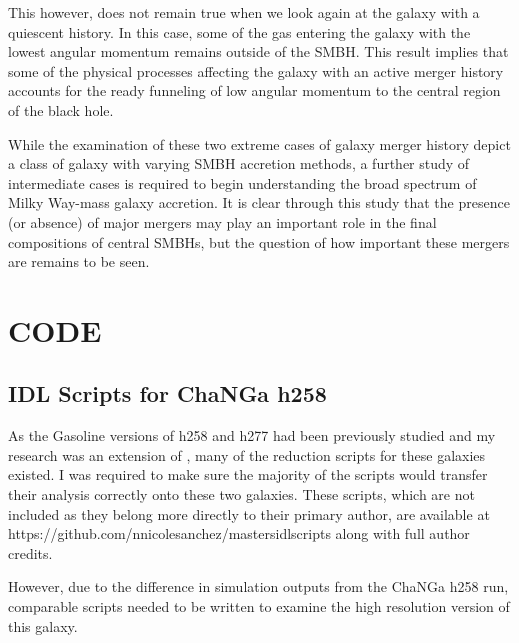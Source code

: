 \documentclass[12pt,headA,chapB]{fiskthesis}
\begin{document}
This however, does not remain true when we look again at the galaxy with a quiescent history. In this case, some of the gas entering the galaxy with the lowest angular momentum remains outside of the SMBH. This result implies that some of the physical processes affecting the galaxy with an active merger history accounts for the ready funneling of low angular momentum to the central region of the black hole. 

While the examination of these two extreme cases of galaxy merger history depict a class of galaxy with varying SMBH accretion methods, a further study of intermediate cases is required to begin understanding the broad spectrum of Milky Way-mass galaxy accretion. It is clear through this study that the presence (or absence) of major mergers may play an important role in the final compositions of central SMBHs, but the question of how important these mergers are remains to be seen.




\chapter{CODE}
\section{IDL Scripts for ChaNGa h258}
As the Gasoline versions of h258 and h277 had been previously studied and my research was an extension of \cite{Bellovary2013}, many of the reduction scripts for these galaxies existed. I was required to make sure the majority of the scripts would transfer their analysis correctly onto these two galaxies. These scripts, which are not included as they belong more directly to their primary author, are available at https://github.com/nnicolesanchez/mastersidlscripts along with full author credits.

However, due to the difference in simulation outputs from the ChaNGa h258 run, comparable scripts needed to be written to examine the high resolution version of this galaxy.
\end{document}
